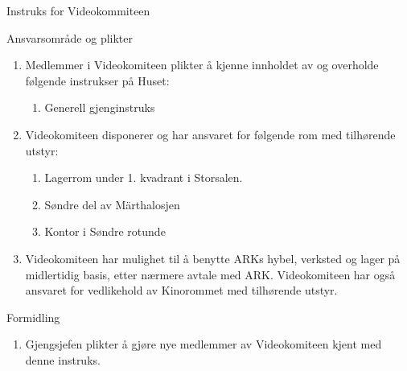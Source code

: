 \begin{instruks}{Instruks for Videokommiteen}{ }{ }
     \begin{instruksledd}{Ansvarsområde og plikter}
        \begin{enumerate}
           \item Medlemmer i Videokomiteen plikter å kjenne innholdet av og overholde følgende
                instrukser på Huset:
                \begin{enumerate} 
                    \item Generell gjenginstruks
                \end{enumerate}
            \item Videokomiteen disponerer og har ansvaret for følgende rom med tilhørende utstyr:
                \begin{enumerate}
                    \item Lagerrom under 1. kvadrant i Storsalen.
                    \item Søndre del av Märthalosjen
                    \item Kontor i Søndre rotunde
                \end{enumerate}
            \item Videokomiteen har mulighet til å benytte ARKs hybel, verksted og lager på midlertidig
            basis, etter nærmere
            avtale med ARK. Videokomiteen har også ansvaret for vedlikehold av Kinorommet med
            tilhørende utstyr.
        \end{enumerate}
    \end{instruksledd}

    \begin{instruksledd}{Formidling}
        \begin{enumerate}
            \item Gjengsjefen plikter å gjøre nye medlemmer av Videokomiteen kjent med
                denne instruks.
        \end{enumerate}
    \end{instruksledd}


 \end{instruks}

